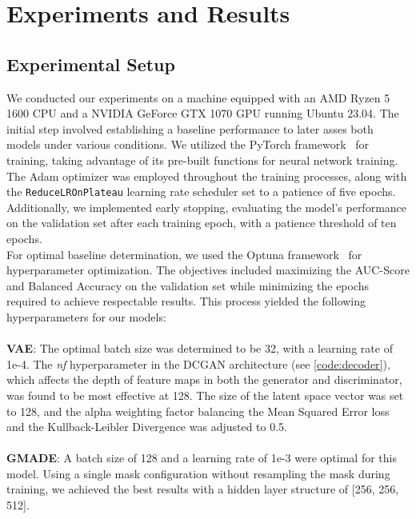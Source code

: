\cleardoubleoddpage%
\chapter{Experiments and Results}
\section{Experimental Setup}
We conducted our experiments on a machine equipped with an AMD Ryzen 5 1600 CPU and a NVIDIA GeForce GTX 1070 GPU running Ubuntu 23.04. The initial step involved establishing a baseline performance to later asses both models under various conditions. We utilized the PyTorch framework~\cite{paszke2019pytorch} for training, taking advantage of its pre-built functions for neural network training. The Adam optimizer was employed throughout the training processes, along with the \lstinline{ReduceLROnPlateau} learning rate scheduler set to a patience of five epochs. Additionally, we implemented early stopping, evaluating the model's performance on the validation set after each training epoch, with a patience threshold of ten epochs.\\
For optimal baseline determination, we used the Optuna framework~\cite{akiba2019optuna} for hyperparameter optimization. The objectives included maximizing the AUC-Score and Balanced Accuracy on the validation set while minimizing the epochs required to achieve respectable results. This process yielded the following hyperparameters for our models:\\\\
\textbf{VAE}: The optimal batch size was determined to be 32, with a learning rate of 1e-4. The \textit{nf} hyperparameter in the DCGAN architecture (see \autoref{code:decoder}), which affects the depth of feature maps in both the generator and discriminator, was found to be most effective at 128. The size of the latent space vector was set to 128, and the alpha weighting factor balancing the Mean Squared Error loss and the Kullback-Leibler Divergence was adjusted to 0.5.\\\\
\textbf{GMADE}: A batch size of 128 and a learning rate of 1e-3 were optimal for this model. Using a single mask configuration without resampling the mask during training, we achieved the best results with a hidden layer structure of [256, 256, 512].
